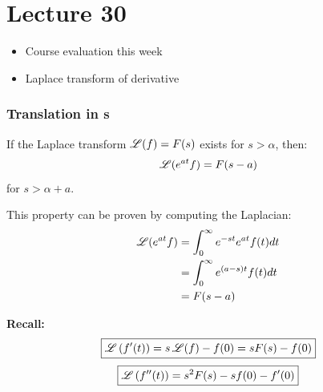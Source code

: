 
\chapter*{Lecture 30}

\begin{recall}{}{}
\begin{itemize}
\item Course evaluation this week
\item Laplace transform of derivative
\end{itemize}
\end{recall}



\subsection{Translation in s}
If the Laplace transform $\operatorname{\mathscr{L}} (f)=F(s)$ exists for $s>\alpha$, then:
\begin{equation}
\operatorname{\mathscr{L}} (e^{at}f)= F(s-a)
\end{equation}
for $s>\alpha+a$.

This property can be proven by computing the Laplacian:
\begin{align*}
\operatorname{\mathscr{L}} (e^{at}f)&= \int^\infty_0 e^{-st}e^{at}f(t) dt\\
&= \int^\infty_0 e^{(a-s)t}f(t) dt\\
&=F(s-a)
\end{align*}

\textbf{Recall:}
\begin{align*}
\boxed{\operatorname{\mathscr{L}} \left(f'(t)\right)= s\operatorname{\mathscr{L}}(f)-f(0)= sF(s)-f(0)}
\end{align*}
\begin{align*}
\boxed{\operatorname{\mathscr{L}} \left(f''(t)\right)= s^2F(s)-s f(0)-f'(0)}
\end{align*}


